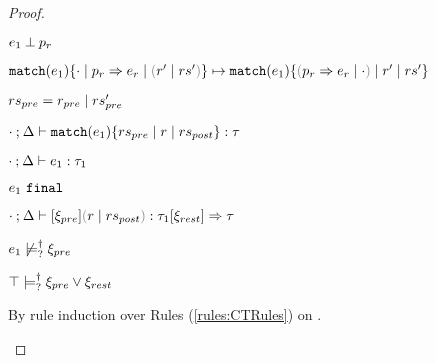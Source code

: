 \begin{proof}
\begin{byCases}
\begin{byCases}
\begin{byCases}
\begin{byCases}
      \item[\text{Scrutinee doesn't matche pattern}]
        \begin{pfsteps*}
        \item $e_1 \mathbin{\bot} p_r$  
        \item $\hlongtrans{\hmatch{e_1}{\zruls{\cdot}{\hrul{p_r}{e_r}}{\hrulesP{r'}{rs'}}}}{\hmatch{e_1}{\zruls{\hrulesP{\hrul{p_r}{e_r}}{\cdot}}{r'}{rs'}}}$ 
        \end{pfsteps*}
      \end{byCases}
    \end{byCases}
  \end{byCases}
    
\resetpfcounter
\item[\text{(\ref{rule:TMatchNZPre})}]
  \begin{pfsteps*}
  \item $rs_{pre} = r_{pre} \mid rs_{pre}'$ 
  \item $\cdot \mathbin{;} \Delta \vdash \mathtt{match}(e_1) \{rs_{pre} \mid r \mid rs_{post}\} : \tau$  
  \item $\cdot \mathbin{;} \Delta \vdash e_1 : \tau_1$  
  \item $e_1 ~\mathtt{final}$  
  \item $\chrulstyp{\cdot}{\Delta}{\xi_{pre}}{\hrulesP{r}{rs_{post}}}{\tau_1}{\xi_{rest}}{\tau}$  
  \item $e_1 \not\models_{?}^{\dag} \xi_{pre}$  
  \item $\top \models_{?}^{\dag} \xi_{pre} \vee \xi_{rest}$  
  \end{pfsteps*}
  By rule induction over Rules (\ref{rules:CTRules}) on .
  \begin{byCases}


\end{byCases}
\end{byCases}
\end{proof}

